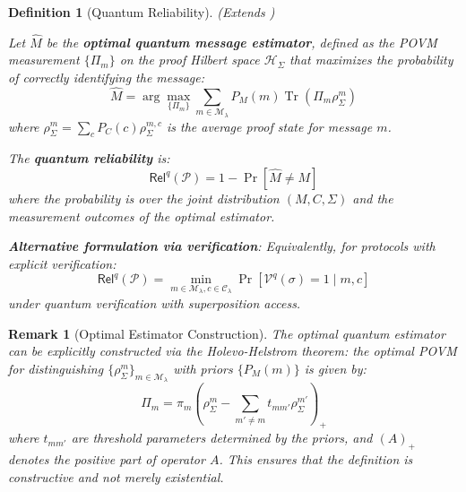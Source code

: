 \documentclass{ieeeaccess}
\newcommand{\Rel}{\mathsf{Rel}}
\newtheorem{definition}{Definition}[section]
\newtheorem{remark}{Remark}[section]
\begin{document}
\begin{definition}[Quantum Reliability]

\label{def:relq}
\textit{(Extends \cite[Definition III-B.2]{Minka2026CRO})}

Let $\hat{M}$ be the \textbf{optimal quantum message estimator}, defined as the POVM measurement $\{\Pi_m\}$ on the proof Hilbert space $\mathcal{H}_\Sigma$ that maximizes the probability of correctly identifying the message:
\begin{equation}
    \hat{M} = \arg\max_{\{\Pi_m\}} \sum_{m \in \mathcal{M}_\lambda} P_M(m) \operatorname{Tr}(\Pi_m \rho_\Sigma^m)
\end{equation}
where $\rho_\Sigma^m = \sum_c P_C(c) \rho_\Sigma^{m,c}$ is the average proof state for message $m$.

The \textbf{quantum reliability} is:
\begin{equation}
    \Rel^q(\mathcal{P}) = 1 - \Pr[\hat{M} \neq M]
\end{equation}
where the probability is over the joint distribution $(M, C, \Sigma)$ and the measurement outcomes of the optimal estimator.

\textbf{Alternative formulation via verification}: Equivalently, for protocols with explicit verification:
\begin{equation}
    \Rel^q(\mathcal{P}) = \min_{m \in \mathcal{M}_\lambda, c \in \mathcal{C}_\lambda} \Pr[\mathcal{V}^q(\sigma) = 1 \mid m, c]
\end{equation}
under quantum verification with superposition access.
\end{definition}

\begin{remark}[Optimal Estimator Construction]
The optimal quantum estimator can be explicitly constructed via the Holevo-Helstrom theorem: the optimal POVM for distinguishing $\{\rho_\Sigma^m\}_{m \in \mathcal{M}_\lambda}$ with priors $\{P_M(m)\}$ is given by:
\begin{equation}
    \Pi_m = \pi_m \left( \rho_\Sigma^m - \sum_{m' \neq m} t_{mm'} \rho_\Sigma^{m'} \right)_+
\end{equation}
where $t_{mm'}$ are threshold parameters determined by the priors, and $(A)_+$ denotes the positive part of operator $A$. This ensures that the definition is constructive and not merely existential.
\end{remark}
\end{document}
